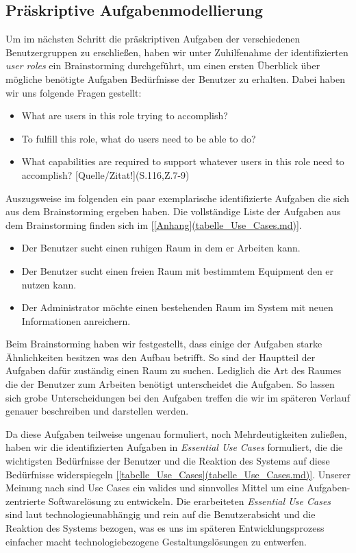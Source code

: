 \subsection{Präskriptive Aufgabenmodellierung}
\label{sec:Präskriptive Aufgabenmodellierung}

Um im nächsten Schritt die präskriptiven Aufgaben der verschiedenen
Benutzergruppen zu erschließen, haben wir unter Zuhilfenahme der
identifizierten \textit{user roles} ein Brainstorming durchgeführt, um einen
ersten Überblick über mögliche benötigte Aufgaben \bzw Bedürfnisse der Benutzer
zu erhalten.
Dabei haben wir uns folgende Fragen gestellt:

\begin{itemize}
	\item What are users in this role trying to accomplish?
	\item To fulfill this role, what do users need to be able to do?
	\item What capabilities are required to support whatever users in this role need to accomplish? \citep{Constantine1999}[Quelle/Zitat!](S.116,Z.7-9)
\end{itemize}


Auszugsweise im folgenden ein paar exemplarische identifizierte Aufgaben die
sich aus dem Brainstorming ergeben haben. Die vollständige Liste der Aufgaben
aus dem Brainstorming finden sich im \ref{[Anhang](tabelle_Use_Cases.md)}.

\begin{itemize}
	\item Der Benutzer sucht einen ruhigen Raum in dem er Arbeiten kann.
	\item Der Benutzer sucht einen freien Raum mit bestimmtem Equipment den er nutzen kann.
	\item Der Administrator möchte einen bestehenden Raum im System mit neuen Informationen anreichern.
\end{itemize}

Beim Brainstorming haben wir festgestellt, dass einige der Aufgaben  starke
Ähnlichkeiten besitzen was den Aufbau betrifft. So sind der Hauptteil der
Aufgaben dafür zuständig einen Raum zu suchen. Lediglich die Art des Raumes die
der Benutzer zum Arbeiten benötigt unterscheidet die Aufgaben. So lassen sich
grobe Unterscheidungen bei den Aufgaben treffen die wir im späteren Verlauf
genauer beschreiben und darstellen werden.

Da diese Aufgaben teilweise ungenau formuliert, \bzw noch Mehrdeutigkeiten
zuließen, haben wir die identifizierten Aufgaben in \textit{Essential Use Cases}
formuliert, die die wichtigsten Bedürfnisse der Benutzer und die Reaktion des
Systems auf diese Bedürfnisse widerspiegeln \ref{[tabelle_Use_Cases](tabelle_Use_Cases.md)}.
Unserer Meinung nach sind Use Cases ein valides und sinnvolles Mittel um eine
Aufgaben-zentrierte Softwarelösung zu entwickeln.
Die erarbeiteten \textit{Essential Use Cases} sind laut \citep{[Definition](Buchverweis)}
technologieunabhängig und rein auf die Benutzerabsicht und die Reaktion des
Systems bezogen, was es uns im späteren Entwicklungsprozess einfacher macht
technologiebezogene Gestaltungslösungen zu entwerfen.

